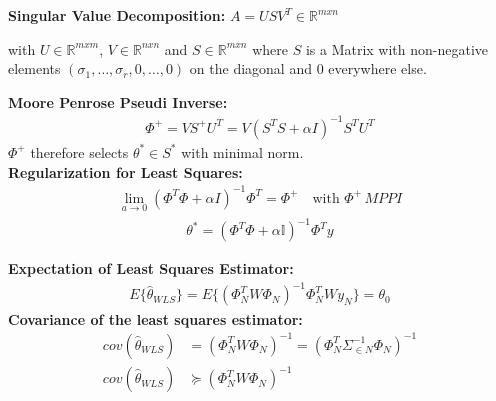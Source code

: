 \begin{tcolorbox}[colback=red!5!white,colframe=red!75!black,title=\textbf{Ill-Posed Least Squares}]	
\textbf{Singular Value Decomposition: } $A = USV^T \in\mathbb R^{mxn} $
\begin{addmargin}[1em]{0em}
	with $U\in\mathbb R^{mxm}$, $V\in\mathbb R^{nxn}$ and $S\in\mathbb R^{mxn}$ where $S$ is a Matrix with non-negative elements $(\sigma_1,\dots,\sigma_r, 0,\dots,0)$ on the diagonal and 0 everywhere else.
\end{addmargin}
\textbf{Moore Penrose Pseudi Inverse: }
\begin{align*}
	\Phi^+ = VS^+ U^T = V(S^T S+\alpha I)^{-1} S^T U^T
\end{align*}
\hspace{1em} $\Phi^+$ therefore selects $\theta^* \in S^*$ with minimal norm. \\
\textbf{Regularization for Least Squares:}
\begin{align*}
	\underset{a \rightarrow 0}{\lim} (\Phi^T \Phi + \alpha I)^{-1} \Phi^T = \Phi^+ \quad \text{with }\Phi^+ \, MPPI 
\end{align*}
\begin{align*}
\theta^* = (\Phi^T \Phi + \alpha \mathbb{I})^{-1} \Phi^T y
\end{align*}
\end{tcolorbox}

\begin{tcolorbox}[colback=red!5!white,colframe=red!75!black,title=\textbf{Statistical Analysis of WLS}]
\textbf{Expectation of Least Squares Estimator: }
\begin{align*}
	E \{\hat \theta_{WLS} \} = E \{ {(\Phi_{N}^{T} W \Phi_N)}^{-1} \Phi_{N}^{T} W y_N \} = \theta_0
\end{align*}
\textbf{Covariance of the least squares estimator: }
\begin{align*}
	cov(\hat \theta_{WLS}) &= {(\Phi_{N}^{T} W \Phi_N)}^{-1} = {(\Phi_{N}^{T} \Sigma_{\in N }^{-1} \Phi_{N}) }^{-1} \\
	cov(\hat \theta_{WLS}) &\succeq {(\Phi_{N}^{T} W \Phi_{N})}^{-1}
\end{align*}
\end{tcolorbox}

